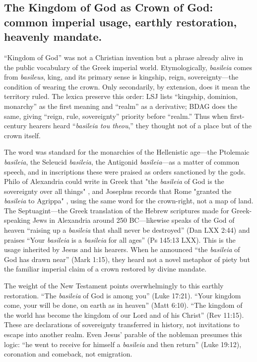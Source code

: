 \subsection{The Kingdom of God as Crown of God: common imperial usage, earthly restoration, heavenly mandate.}\label{subsec:the-kingdom-of-god-as-crown-of-god-common-imperial-usage-earthly-restoration-heavenly-mandate}
“Kingdom of God” was not a Christian invention but a phrase already alive in the public vocabulary of the Greek imperial world.
Etymologically, \emph{basileia} comes from \emph{basileus}, king, and its primary sense is kingship, reign, sovereignty---the condition of wearing the crown.
Only secondarily, by extension, does it mean the territory ruled.
The lexica preserve this order: LSJ lists “kingship, dominion, monarchy” as the first meaning and “realm” as a derivative; BDAG does the same, giving “reign, rule, sovereignty” priority before “realm.”
Thus when first-century hearers heard “\emph{basileia tou theou},” they thought not of a place but of the crown itself.

The word was standard for the monarchies of the Hellenistic age---the Ptolemaic \emph{basileia}, the Seleucid \emph{basileia}, the Antigonid \emph{basileia}---as a matter of common speech, and in inscriptions these were praised as orders sanctioned by the gods.
Philo of Alexandria could write in Greek that "the \emph{basileia} of God is the sovereignty over all things" \cite[4.164]{philo:specleg}, and Josephus records that Rome "granted the \emph{basileia} to Agrippa" \cite[19.343]{josephus:ant}, using the same word for the crown-right, not a map of land.
The Septuagint---the Greek translation of the Hebrew scriptures made for Greek-speaking Jews in Alexandria around 250 BC---likewise speaks of the God of heaven ``raising up a \emph{basileia} that shall never be destroyed'' (Dan LXX 2:44) and praises ``Your \emph{basileia} is a \emph{basileia} for all ages'' (Ps 145:13 LXX).
This is the usage inherited by Jesus and his hearers.
When he announced “the \emph{basileia} of God has drawn near” (Mark 1:15), they heard not a novel metaphor of piety but the familiar imperial claim of a crown restored by divine mandate.

The weight of the New Testament points overwhelmingly to this earthly restoration.
“The \emph{basileia} of God is among you” (Luke 17:21).
“Your kingdom come, your will be done, on earth as in heaven” (Matt 6:10).
“The kingdom of the world has become the kingdom of our Lord and of his Christ” (Rev 11:15).
These are declarations of sovereignty transferred in history, not invitations to escape into another realm.
Even Jesus’ parable of the nobleman presumes this logic: “he went to receive for himself a \emph{basileia} and then return” (Luke 19:12), coronation and comeback, not emigration.

